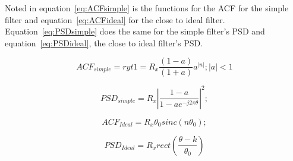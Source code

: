 \documentclass[10pt]{article}
\begin{document}
Noted in equation~\ref{eq:ACFsimple} is the functions for the ACF
for the simple filter and equation~\ref{eq:ACFideal} for the close to ideal filter.
Equation~\ref{eq:PSDsimple} does the same for the simple filter's PSD
and equation~\ref{eq:PSDideal}, the close to ideal filter's PSD.

\begin{equation}
  \label{eq:ACFsimple}
  ACF_{simple} = ryt1 = R_x\frac{(1-a)}{(1+a)}a^{|n|};  |a| < 1
\end{equation}

\begin{equation}
  \label{eq:PSDsimple}
  PSD_{simple} =  R_x|\frac{1-a}{1-ae^{-j2\pi\theta}}|^2;
\end{equation}

\begin{equation}
  \label{eq:ACFideal}
  ACF_{Ideal} = R_x\theta_{0}sinc(n\theta_0);
\end{equation}

\begin{equation}
  \label{eq:PSDideal}
  PSD_{Ideal} = R_xrect(\frac{\theta - k}{\theta_0})
\end{equation}
\clearpage
\end{document}
